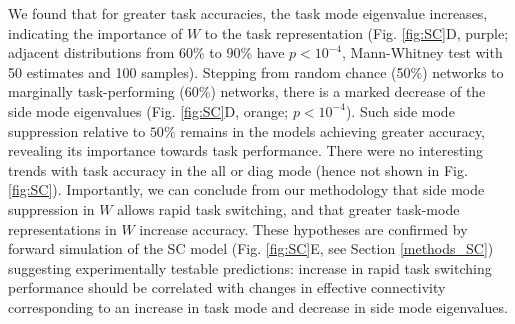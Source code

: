 \documentclass[11pt]{article}
\begin{document}
We found that for greater task accuracies, the task mode eigenvalue increases, indicating the importance of $W$ to the task representation (Fig. \ref{fig:SC}D, purple; adjacent distributions from 60\% to 90\% have  $p<10^{-4}$, Mann-Whitney test with 50 estimates and 100 samples).
Stepping from random chance (50\%) networks to marginally task-performing (60\%) networks, there is a marked decrease of the side mode eigenvalues (Fig. \ref{fig:SC}D, orange; $p<10^{-4}$).  
Such side mode suppression relative to $50\%$ remains in the models achieving greater accuracy, revealing its importance towards task performance.
There were no interesting trends with task accuracy in the all or diag mode (hence not shown in Fig. \ref{fig:SC}). 
Importantly, we can conclude from our methodology that side mode suppression in $W$ allows rapid task switching, and that greater task-mode representations in $W$ increase accuracy.  
These hypotheses are confirmed by forward simulation of the SC model (Fig. \ref{fig:SC}E, see Section \ref{methods_SC}) suggesting experimentally testable predictions: increase in rapid task switching performance should be correlated with changes in effective connectivity corresponding to an increase in task mode and decrease in side mode eigenvalues.

\end{document}
